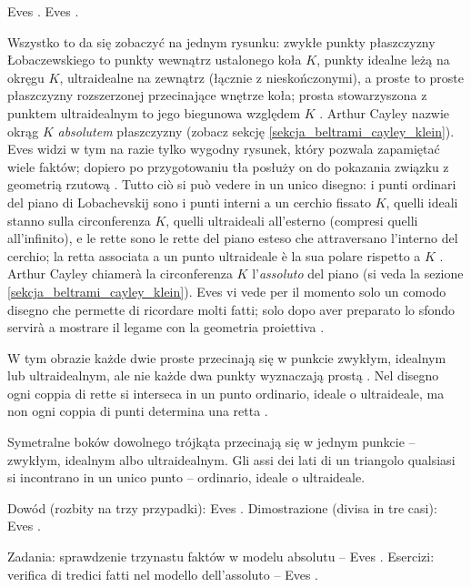 Eves \cite[s. 306]{eves1_1972}. %
Eves \cite[p. 306]{eves1_1972}. %

Wszystko to da się zobaczyć na jednym rysunku: zwykłe punkty płaszczyzny Łobaczewskiego to punkty wewnątrz ustalonego koła $K$, punkty idealne leżą na okręgu $K$, ultraidealne na zewnątrz (łącznie z nieskończonymi), a proste to proste płaszczyzny rozszerzonej przecinające wnętrze koła; prosta stowarzyszona z punktem ultraidealnym to jego biegunowa względem $K$ \cite[s. 306--307]{eves1_1972}. %
Arthur Cayley nazwie okrąg $K$ \emph{absolutem} płaszczyzny (zobacz sekcję \ref{sekcja_beltrami_cayley_klein}). %
Eves widzi w tym na razie tylko wygodny rysunek, który pozwala zapamiętać wiele faktów; dopiero po przygotowaniu tła posłuży on do pokazania związku z geometrią rzutową \cite[s. 307]{eves1_1972}. %
Tutto ciò si può vedere in un unico disegno: i punti ordinari del piano di Lobachevskij sono i punti interni a un cerchio fissato $K$, quelli ideali stanno sulla circonferenza $K$, quelli ultraideali all'esterno (compresi quelli all'infinito), e le rette sono le rette del piano esteso che attraversano l'interno del cerchio; la retta associata a un punto ultraideale è la sua polare rispetto a $K$ \cite[p. 306--307]{eves1_1972}. %
Arthur Cayley chiamerà la circonferenza $K$ l'\emph{assoluto} del piano (si veda la sezione \ref{sekcja_beltrami_cayley_klein}). %
Eves vi vede per il momento solo un comodo disegno che permette di ricordare molti fatti; solo dopo aver preparato lo sfondo servirà a mostrare il legame con la geometria proiettiva \cite[p. 307]{eves1_1972}. %

W tym obrazie każde dwie proste przecinają się w punkcie zwykłym, idealnym lub ultraidealnym, ale nie każde dwa punkty wyznaczają prostą \cite[s. 307]{eves1_1972}. %
Nel disegno ogni coppia di rette si interseca in un punto ordinario, ideale o ultraideale, ma non ogni coppia di punti determina una retta \cite[p. 307]{eves1_1972}. %

\begin{theorem}
	Symetralne boków dowolnego trójkąta przecinają się w jednym punkcie -- zwykłym, idealnym albo ultraidealnym. %
	Gli assi dei lati di un triangolo qualsiasi si incontrano in un unico punto -- ordinario, ideale o ultraideale. %
\end{theorem}

Dowód (rozbity na trzy przypadki): Eves \cite[s. 308--311]{eves1_1972}. %
Dimostrazione (divisa in tre casi): Eves \cite[p. 308--311]{eves1_1972}. %

Zadania: sprawdzenie trzynastu faktów w modelu absolutu -- Eves \cite[s. 307--308]{eves1_1972}. %
Esercizi: verifica di tredici fatti nel modello dell'assoluto -- Eves \cite[p. 307--308]{eves1_1972}. %
